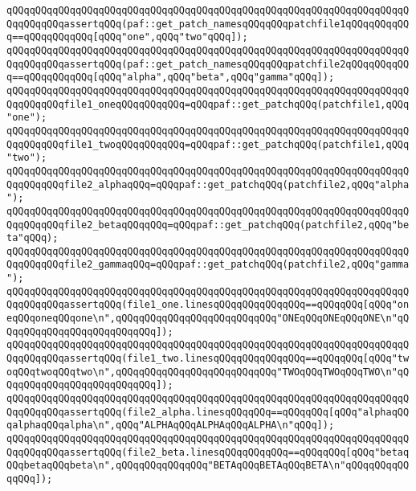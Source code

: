 \verb|qQQqqQQqqQQqqQQqqQQqqQQqqQQqqQQqqQQqqQQqqQQqqQQqqQQqqQQqqQQqqQQqqQQqqQQqqQQqqQQqassertqQQq(paf::get_patch_namesqQQqqQQqpatchfile1qQQqqQQqqQQq==qQQqqQQqqQQq[qQQq"one",qQQq"two"qQQq]);|\newline
\verb|qQQqqQQqqQQqqQQqqQQqqQQqqQQqqQQqqQQqqQQqqQQqqQQqqQQqqQQqqQQqqQQqqQQqqQQqqQQqqQQqassertqQQq(paf::get_patch_namesqQQqqQQqpatchfile2qQQqqQQqqQQq==qQQqqQQqqQQq[qQQq"alpha",qQQq"beta",qQQq"gamma"qQQq]);|\newline
\newline
\verb|qQQqqQQqqQQqqQQqqQQqqQQqqQQqqQQqqQQqqQQqqQQqqQQqqQQqqQQqqQQqqQQqqQQqqQQqqQQqqQQqfile1_oneqQQqqQQqqQQq=qQQqpaf::get_patchqQQq(patchfile1,qQQq"one");|\newline
\verb|qQQqqQQqqQQqqQQqqQQqqQQqqQQqqQQqqQQqqQQqqQQqqQQqqQQqqQQqqQQqqQQqqQQqqQQqqQQqqQQqfile1_twoqQQqqQQqqQQq=qQQqpaf::get_patchqQQq(patchfile1,qQQq"two");|\newline
\newline
\verb|qQQqqQQqqQQqqQQqqQQqqQQqqQQqqQQqqQQqqQQqqQQqqQQqqQQqqQQqqQQqqQQqqQQqqQQqqQQqqQQqfile2_alphaqQQq=qQQqpaf::get_patchqQQq(patchfile2,qQQq"alpha");|\newline
\verb|qQQqqQQqqQQqqQQqqQQqqQQqqQQqqQQqqQQqqQQqqQQqqQQqqQQqqQQqqQQqqQQqqQQqqQQqqQQqqQQqfile2_betaqQQqqQQq=qQQqpaf::get_patchqQQq(patchfile2,qQQq"beta"qQQq);|\newline
\verb|qQQqqQQqqQQqqQQqqQQqqQQqqQQqqQQqqQQqqQQqqQQqqQQqqQQqqQQqqQQqqQQqqQQqqQQqqQQqqQQqfile2_gammaqQQq=qQQqpaf::get_patchqQQq(patchfile2,qQQq"gamma");|\newline
\newline
\verb|qQQqqQQqqQQqqQQqqQQqqQQqqQQqqQQqqQQqqQQqqQQqqQQqqQQqqQQqqQQqqQQqqQQqqQQqqQQqqQQqassertqQQq(file1_one.linesqQQqqQQqqQQqqQQq==qQQqqQQq[qQQq"oneqQQqoneqQQqone\n",qQQqqQQqqQQqqQQqqQQqqQQqqQQq"ONEqQQqONEqQQqONE\n"qQQqqQQqqQQqqQQqqQQqqQQqqQQq]);|\newline
\verb|qQQqqQQqqQQqqQQqqQQqqQQqqQQqqQQqqQQqqQQqqQQqqQQqqQQqqQQqqQQqqQQqqQQqqQQqqQQqqQQqassertqQQq(file1_two.linesqQQqqQQqqQQqqQQq==qQQqqQQq[qQQq"twoqQQqtwoqQQqtwo\n",qQQqqQQqqQQqqQQqqQQqqQQqqQQq"TWOqQQqTWOqQQqTWO\n"qQQqqQQqqQQqqQQqqQQqqQQqqQQq]);|\newline
\newline
\verb|qQQqqQQqqQQqqQQqqQQqqQQqqQQqqQQqqQQqqQQqqQQqqQQqqQQqqQQqqQQqqQQqqQQqqQQqqQQqqQQqassertqQQq(file2_alpha.linesqQQqqQQq==qQQqqQQq[qQQq"alphaqQQqalphaqQQqalpha\n",qQQq"ALPHAqQQqALPHAqQQqALPHA\n"qQQq]);|\newline
\verb|qQQqqQQqqQQqqQQqqQQqqQQqqQQqqQQqqQQqqQQqqQQqqQQqqQQqqQQqqQQqqQQqqQQqqQQqqQQqqQQqassertqQQq(file2_beta.linesqQQqqQQqqQQq==qQQqqQQq[qQQq"betaqQQqbetaqQQqbeta\n",qQQqqQQqqQQqqQQq"BETAqQQqBETAqQQqBETA\n"qQQqqQQqqQQqqQQq]);|\newline

